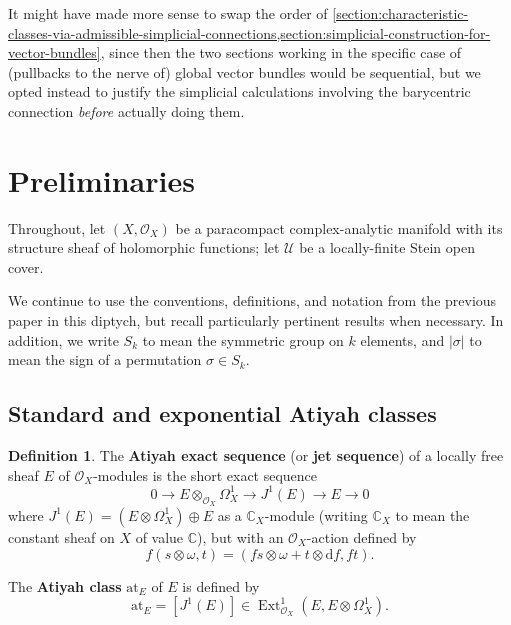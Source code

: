 \documentclass[11pt,fleqn]{article}
\theoremstyle{plain}
\theoremstyle{definition}
\newtheorem{definition}[theorem]{Definition}
\theoremstyle{remark}
\numberwithin{equation}{theorem}
\newcommand{\cover}{\mathcal{U}}
\newcommand{\OO}{\mathcal{O}}
\newcommand{\at}{\mathrm{at}}
\newcommand{\sym}[1]{S_{#1}}
\newcommand{\sgn}[1]{|#1|}
\newcommand{\define}[1]{\textbf{#1}}
\renewcommand{\d}{\mathrm{d}}
\DeclareMathOperator{\Ext}{Ext}
\begin{document}
        \bigskip

        It might have made more sense to swap the order of \cref{section:characteristic-classes-via-admissible-simplicial-connections,section:simplicial-construction-for-vector-bundles}, since then the two sections working in the specific case of (pullbacks to the nerve of) global vector bundles would be sequential, but we opted instead to justify the simplicial calculations involving the barycentric connection \emph{before} actually doing them.



\section{Preliminaries}\label{section:preliminaries}

    Throughout, let $(X,\OO_X)$ be a paracompact complex-analytic manifold with its structure sheaf of holomorphic functions; let $\cover$ be a locally-finite Stein open cover.

    We continue to use the conventions, definitions, and notation from the previous paper in this diptych, but recall particularly pertinent results when necessary.
    In addition, we write $\sym{k}$ to mean the symmetric group on $k$ elements, and $\sgn{\sigma}$ to mean the sign of a permutation $\sigma\in\sym{k}$.

    \subsection{Standard and exponential Atiyah classes}

        \begin{definition}
            The \define{Atiyah exact sequence} (or \define{jet sequence}) of a locally free sheaf $E$ of $\OO_X$-modules is the short exact sequence
            \[
                0
                \to
                E\otimes_{\OO_X}\Omega_X^1
                \to
                J^1(E)
                \to
                E
                \to
                0
            \]
            where $J^1(E)=(E\otimes\Omega_X^1)\oplus E$ as a $\mathbb{C}_X$-module (writing $\mathbb{C}_X$ to mean the constant sheaf on $X$ of value $\mathbb{C}$), but with an $\OO_X$-action defined by
            \[
                f(s\otimes\omega,t)
                =
                (fs\otimes\omega + t\otimes\d f, ft).
            \]

            The \define{Atiyah class} $\at_E$ of $E$ is defined by
            \[
                \at_E
                =
                [J^1(E)] \in \Ext_{\OO_X}^1(E,E\otimes\Omega_X^1).
            \]
        \end{definition}
\end{document}
